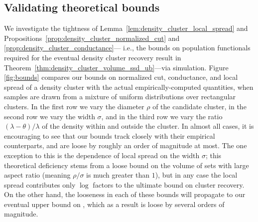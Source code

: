 \documentclass[11pt,twoside]{article}
\newcommand{\1}{\mathbf{1}}
\newcommand{\mc}[1]{\mathcal{#1}}
\newcommand{\wh}[1]{\widehat{#1}}
\newcommand{\vol}{\mathrm{vol}}
\begin{document}
\subsection{Validating theoretical bounds}
We investigate the tightness of Lemma~\ref{lem:density_cluster_local_spread} and Propositions~\ref{prop:density_cluster_normalized_cut} and \ref{prop:density_cluster_conductance}--- i.e., the bounds on population functionals required for the eventual density cluster recovery result in Theorem~\ref{thm:density_cluster_volume_ssd_ub}---via simulation. Figure \ref{fig:bounds} compares our bounds on normalized cut, conductance, and local spread of a density cluster with the actual empirically-computed quantities, when samples are drawn from a mixture of uniform distributions over rectangular clusters. In the first row we vary the diameter $\rho$ of the candidate cluster, in the second row we vary the width $\sigma$, and in the third row we vary the ratio $(\lambda - \theta)/\lambda$ of the density within and outside the cluster. In almost all cases, it is encouraging to see that our bounds track closely with their empirical counterparts, and are loose by roughly an order of magnitude at most. The one exception to this is the dependence of local spread on the width $\sigma$; this theoretical deficiency stems from a loose bound on the volume of sets with large aspect ratio (meaning $\rho/\sigma$ is much greater than $1$), but in any case the local spread contributes only $\log$ factors to the ultimate bound on cluster recovery. On the other hand, the looseness in each of these bounds will propagate to our eventual upper bound on \smash{$\Delta(\wh{C},\mc{C}_{\lambda,\sigma}[X])/\vol_{n,r}(\mc{C}_{\lambda,\sigma}[X])$}, which as a result is loose by several orders of magnitude. 
\end{document}
